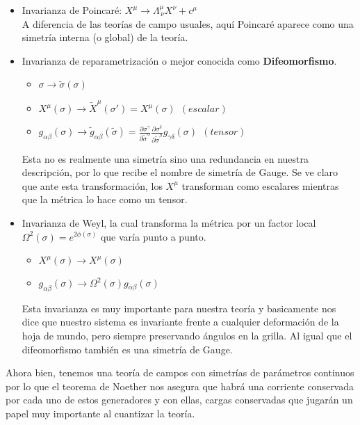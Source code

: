\documentclass[]{article}
\begin{document}
\begin{itemize}
	\item Invarianza de Poincaré:
	 $X^{\mu}\rightarrow\Lambda_{\,\nu}^{\mu}X^{\nu}+c^{\mu}$\\
	 
	 A diferencia de las teorías de campo usuales, aquí Poincaré aparece como una simetría interna (o global) de la teoría.
	
	
	\item Invarianza de reparametrización o mejor conocida como \textbf{Difeomorfismo}.
	\begin{itemize}
		\item $\sigma\rightarrow\tilde{\sigma}(\sigma)$
		\item $X^{\mu}(\sigma)\rightarrow \tilde{X}^{\mu}(\sigma')=X^{\mu}(\sigma) \ \ (escalar)$
		\item $g_{\alpha\beta}(\sigma)\rightarrow \tilde{g}_{\alpha\beta}(\tilde{\sigma})=\frac{\partial\sigma{}^{\gamma}}{\partial\tilde{\sigma}^{\alpha}}\frac{\partial\sigma^{\delta}}{\partial\tilde{\sigma}^{\beta}}g_{\gamma\delta}(\sigma) \ \ (tensor)$
	\end{itemize}

	Esta no es realmente una simetría sino una redundancia en nuestra descripción, por lo que recibe el nombre de simetría de Gauge. Se ve claro que ante esta transformación, los $ X^{\mu} $ transforman como escalares mientras que la métrica lo hace como un tensor.


	\item Invarianza de Weyl, la cual transforma la métrica por un factor local
	$\Omega^{2}(\sigma)=e^{2\phi(\sigma)}$ que varía punto a punto.
	\begin{itemize}
		\item $X^{\mu}(\sigma)\rightarrow X^{\mu}(\sigma)$
		\item $g_{\alpha\beta}(\sigma)\rightarrow\Omega^{2}(\sigma)g{}_{\alpha\beta}(\sigma)$ 
	\end{itemize}

	Esta invarianza es muy importante para nuestra teoría y basicamente nos dice que nuestro sistema es invariante frente a cualquier deformación de la hoja de mundo, pero siempre preservando ángulos en la grilla. Al igual que el difeomorfismo también es una simetría de Gauge.
\end{itemize}

\noindent Ahora bien, tenemos una teoría de campos con simetrías de parámetros continuos por lo que el teorema de Noether nos asegura que habrá una corriente conservada por cada uno de estos generadores y con ellas, cargas conservadas que jugarán un papel muy importante al cuantizar la teoría.
\end{document}

